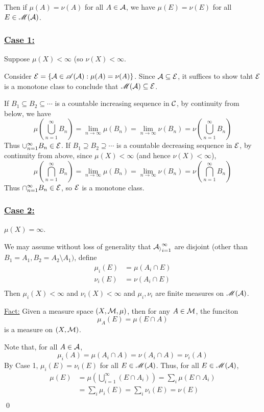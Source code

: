 \documentclass[x11names,reqno,14pt]{extarticle}
\newcommand*{\oo}{\infty}
\newcommand{\seq}[1]{_{#1 = 1}^\oo}
\begin{document}
Then if $\mu(A) = \nu(A)$ for all $A \in \mathcal{A}$, we have $\mu(E) = \nu(E)$ for all $E \in \mathscr{M}(\mathcal{A})$. 

\proof

\subsubsection*{\underline{Case 1:}} Suppose $\mu(X)<\oo$ (so $\nu(X)<\oo$. 

Consider $\mathcal{E} = \{\mathcal{A}\in\mathscr{A}(\mathcal{A}): \mu(A) = \nu(A)\}$. Since $\mathcal{A}\subseteq\mathcal{E}$, it suffices to show taht $\mathcal{E}$ is a monotone class to conclude that $\mathscr{M}(\mathcal{A})\subseteq\mathcal{E}$. 

If $B_1 \subseteq B_2 \subseteq \cdots$ is a countable increasing sequence in $\mathcal{C}$, by continuity from below, we have
\[
\mu\left(\bigcup\seq{n}B_n\right) = \lim_{n\to\oo}\mu(B_n) = \lim_{n\to\oo}\nu(B_n) = \nu\left(\bigcup\seq{n}B_n\right)
\]
Thus $\cup\seq{n}B_n\in\mc{E}$. If $B_1\supseteq B_2\supseteq\cdots$ is a countable decreasing sequence in $\mathcal{E}$, by continuity from above, since $\mu(X)<\oo$ (and hence $\nu(X)<\oo$), 
\[
\mu\left(\bigcap\seq{n}B_n\right)=\lim_{n\to\oo}\mu(B_n) = \lim_{n\to\oo}\nu(B_n) = \nu\left(\bigcap\seq{n}B_n\right)
\]
Thus $\cap\seq{n}B_n\in\mc{E}$, so $\mathcal{E}$ is a monotone class. 

\subsubsection*{\underline{Case 2:}} $\mu(X) = \oo$. 

We may assume without loss of generality that $\mc{A_i}\seq{i}$ are disjoint (other than $B_1 = A_1, B_2 = A_2\setminus A_1)$, define
\begin{align*}
\mu_i(E) & = \mu(A_i \cap E) \\
\nu_i(E) & = \nu(A_i \cap E) \\
\end{align*}
Then $\mu_i(X)<\oo$ and $\nu_i(X)<\oo$ and $\mu_i, \nu_i$ are finite measures on $\mathscr{M}(\mathcal{A})$. 

\underline{Fact:} Given a measure space $(X,\mathcal{M},\mu)$, then for any $A\in\mathcal{M}$, the funciton 
\[
\mu_A(E) = \mu(E \cap A)
\]
is a measure on $(X, \mathcal{M})$. 

Note that, for all $A \in \mathcal{A}$, 
\[
\mu_i(A) = \mu(A_i \cap A) = \nu(A_i \cap A) = \nu_i(A)
\]
By Case 1, $\mu_i(E) = \nu_i(E)$ for all $E \in \mathscr{M}(\mathcal{A})$. Thus, for all $E \in \mathscr{M}(\mathcal{A})$, 
\begin{align*}
\mu(E) & = \mu\left(\bigcup\seq{i}(E\cap A_i) \right) = \sum_i\mu(E \cap A_i) \\
& = \sum_i \mu_i(E) = \sum_i\nu_i(E) = \nu(E) \\
\end{align*}
\qed
\end{document}
